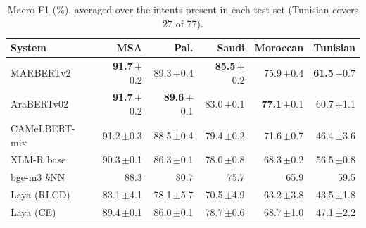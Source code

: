 \begin{table}[t]\centering\small\setlength{\tabcolsep}{4pt}\caption{Macro-F1 (\%), averaged over the intents present in each test set (Tunisian covers 27 of 77).}\label{tab:f1}
\begin{tabular}{lrrrrr}\toprule
System & MSA & Pal. & Saudi & Moroccan & Tunisian \\\midrule
MARBERTv2 & \textbf{91.7}\,{\scriptsize$\pm$0.2} & 89.3\,{\scriptsize$\pm$0.4} & \textbf{85.5}\,{\scriptsize$\pm$0.2} & 75.9\,{\scriptsize$\pm$0.4} & \textbf{61.5}\,{\scriptsize$\pm$0.7} \\
AraBERTv02 & \textbf{91.7}\,{\scriptsize$\pm$0.2} & \textbf{89.6}\,{\scriptsize$\pm$0.1} & 83.0\,{\scriptsize$\pm$0.1} & \textbf{77.1}\,{\scriptsize$\pm$0.1} & 60.7\,{\scriptsize$\pm$1.1} \\
CAMeLBERT-mix & 91.2\,{\scriptsize$\pm$0.3} & 88.5\,{\scriptsize$\pm$0.4} & 79.4\,{\scriptsize$\pm$0.2} & 71.6\,{\scriptsize$\pm$0.7} & 46.4\,{\scriptsize$\pm$3.6} \\
XLM-R base & 90.3\,{\scriptsize$\pm$0.1} & 86.3\,{\scriptsize$\pm$0.1} & 78.0\,{\scriptsize$\pm$0.8} & 68.3\,{\scriptsize$\pm$0.2} & 56.5\,{\scriptsize$\pm$0.8} \\
bge-m3 $k$NN & 88.3 & 80.7 & 75.7 & 65.9 & 59.5 \\
Laya (RLCD) & 83.1\,{\scriptsize$\pm$4.1} & 78.1\,{\scriptsize$\pm$5.7} & 70.5\,{\scriptsize$\pm$4.9} & 63.2\,{\scriptsize$\pm$3.8} & 43.5\,{\scriptsize$\pm$1.8} \\
Laya (CE) & 89.4\,{\scriptsize$\pm$0.1} & 86.0\,{\scriptsize$\pm$0.1} & 78.7\,{\scriptsize$\pm$0.6} & 68.7\,{\scriptsize$\pm$1.0} & 47.1\,{\scriptsize$\pm$2.2} \\
\bottomrule\end{tabular}\end{table}
